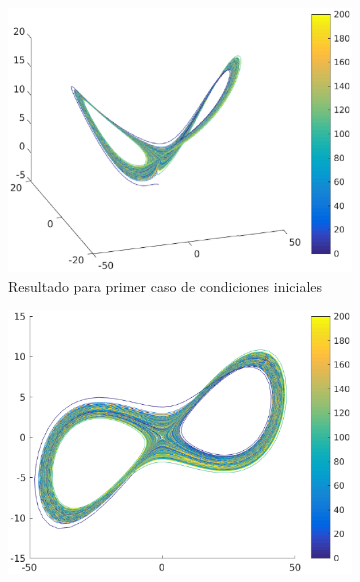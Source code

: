 \documentclass[12pt,letterpaper]{article}
\begin{document}

\begin{figure}
	\centering
	\begin{subfigure}[t]{0.36\textwidth}
		\includegraphics[width=\textwidth]{pictures/tercera_simulacion}
		\caption{Resultado para primer caso de condiciones iniciales}
		\label{fig:simulacion3}
	\end{subfigure}
	\begin{subfigure}[b]{0.36\textwidth}
		\includegraphics[width=\textwidth]{pictures/tercera_simulacion_xy}

\end{subfigure}
\end{figure}
\end{document}
